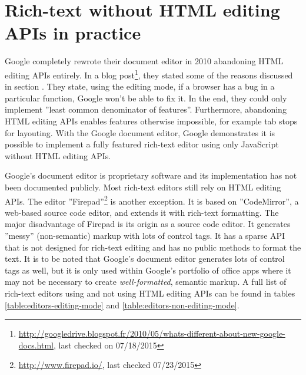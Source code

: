 \section{Rich-text without HTML editing APIs in practice} 

Google completely rewrote their document editor in 2010 abandoning HTML editing APIs entirely. In a blog post\footnote{\url{http://googledrive.blogspot.fr/2010/05/whats-different-about-new-google-docs.html}, last checked on 07/18/2015}, they stated some of the reasons discussed in section . They state, using the editing mode, if a browser has a bug in a particular function, Google won't be able to fix it. In the end, they could only implement ''least common denominator of features''. Furthermore, abandoning HTML editing APIs enables features otherwise impossible, for example tab stops for layouting\cite{bw}. With the Google document editor, Google demonstrates it is possible to implement a fully featured rich-text editor using only JavaScript without HTML editing APIs.




Google's document editor is proprietary software and its implementation has not been documented publicly. Most rich-text editors still rely on HTML editing APIs. The editor ''Firepad''\footnote{\url{http://www.firepad.io/}, last checked 07/23/2015} is another exception. It is based on ''CodeMirror'', a web-based source code editor, and extends it with rich-text formatting. The major disadvantage of Firepad is its origin as a source code editor. It generates ''messy'' (non-semantic) markup with lots of control tags. It has a sparse API that is not designed for rich-text editing and has no public methods to format the text. It is to be noted that Google's document editor generates lots of control tags as well, but it is only used within Google's portfolio of office apps where it may not be necessary to create \textit{well-formatted}, semantic markup. A full list of rich-text editors using and not using HTML editing APIs can be found in tables \ref{table:editors-editing-mode} and \ref{table:editors-non-editing-mode}. %



